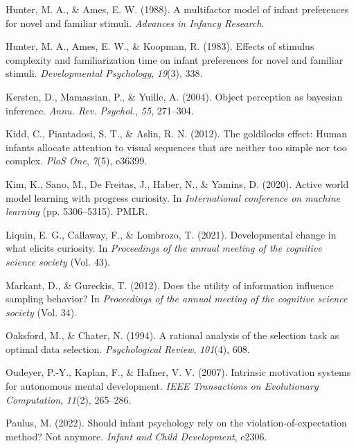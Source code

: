\documentclass[10pt, letterpaper]{article}
\newenvironment{CSLReferences}%
  {}%
  {\par}
\begin{document}
\begin{CSLReferences}{1}{0}
\leavevmode{}%
Hunter, M. A., \& Ames, E. W. (1988). A multifactor model of infant
preferences for novel and familiar stimuli. \emph{Advances in Infancy
Research}.

\leavevmode{}%
Hunter, M. A., Ames, E. W., \& Koopman, R. (1983). Effects of stimulus
complexity and familiarization time on infant preferences for novel and
familiar stimuli. \emph{Developmental Psychology}, \emph{19}(3), 338.

\leavevmode{}%
Kersten, D., Mamassian, P., \& Yuille, A. (2004). Object perception as
bayesian inference. \emph{Annu. Rev. Psychol.}, \emph{55}, 271--304.

\leavevmode{}%
Kidd, C., Piantadosi, S. T., \& Aslin, R. N. (2012). The goldilocks
effect: Human infants allocate attention to visual sequences that are
neither too simple nor too complex. \emph{PloS One}, \emph{7}(5),
e36399.

\leavevmode{}%
Kim, K., Sano, M., De Freitas, J., Haber, N., \& Yamins, D. (2020).
Active world model learning with progress curiosity. In
\emph{International conference on machine learning} (pp. 5306--5315).
PMLR.

\leavevmode{}%
Liquin, E. G., Callaway, F., \& Lombrozo, T. (2021). Developmental
change in what elicits curiosity. In \emph{Proceedings of the annual
meeting of the cognitive science society} (Vol. 43).

\leavevmode{}%
Markant, D., \& Gureckis, T. (2012). Does the utility of information
influence sampling behavior? In \emph{Proceedings of the annual meeting
of the cognitive science society} (Vol. 34).

\leavevmode{}%
Oaksford, M., \& Chater, N. (1994). A rational analysis of the selection
task as optimal data selection. \emph{Psychological Review},
\emph{101}(4), 608.

\leavevmode{}%
Oudeyer, P.-Y., Kaplan, F., \& Hafner, V. V. (2007). Intrinsic
motivation systems for autonomous mental development. \emph{IEEE
Transactions on Evolutionary Computation}, \emph{11}(2), 265--286.

\leavevmode{}%
Paulus, M. (2022). Should infant psychology rely on the
violation-of-expectation method? Not anymore. \emph{Infant and Child
Development}, e2306.


\end{CSLReferences}
\end{document}
